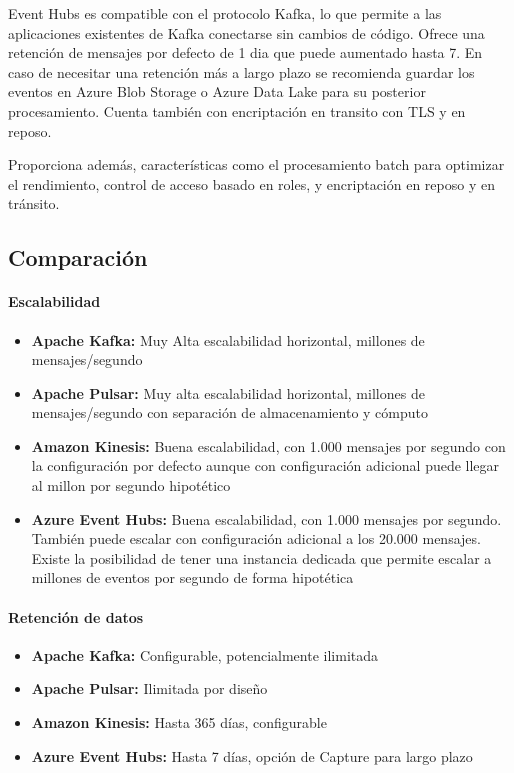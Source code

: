 Event Hubs es compatible con el protocolo Kafka, lo que permite a las aplicaciones existentes de Kafka conectarse sin cambios de código.
Ofrece una retención de mensajes por defecto de 1 dia que puede aumentado hasta 7. En caso de necesitar una retención más a largo plazo
se recomienda guardar los eventos en Azure Blob Storage o Azure Data Lake para su posterior procesamiento. 
Cuenta también con encriptación en transito con TLS y en reposo.\newline

Proporciona además, características como el procesamiento batch para optimizar el rendimiento, 
control de acceso basado en roles, y encriptación en reposo y en tránsito. 

\subsection{Comparación}

\paragraph{Escalabilidad}
\begin{itemize}
    \item \textbf{Apache Kafka:} Muy Alta escalabilidad horizontal, millones de mensajes/segundo
    \item \textbf{Apache Pulsar:} Muy alta escalabilidad horizontal, millones de mensajes/segundo con separación de almacenamiento y cómputo
    \item \textbf{Amazon Kinesis:} Buena escalabilidad, con 1.000 mensajes por segundo con la configuración por defecto aunque con configuración adicional puede llegar al millon por segundo hipotético
    \item \textbf{Azure Event Hubs:} Buena escalabilidad, con 1.000 mensajes por segundo. También puede escalar con configuración adicional a los 20.000 mensajes. Existe la posibilidad de tener una instancia dedicada que permite escalar a millones de eventos por segundo de forma hipotética
\end{itemize}

\newpage
\paragraph{Retención de datos}
\begin{itemize}
    \item \textbf{Apache Kafka:} Configurable, potencialmente ilimitada
    \item \textbf{Apache Pulsar:} Ilimitada por diseño
    \item \textbf{Amazon Kinesis:} Hasta 365 días, configurable
    \item \textbf{Azure Event Hubs:} Hasta 7 días, opción de Capture para largo plazo
\end{itemize}


